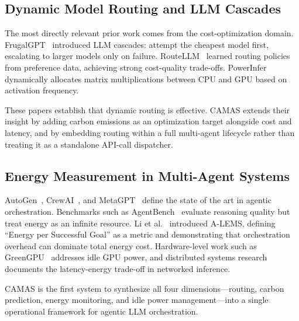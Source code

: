 \documentclass[journal]{IEEEtran}
\begin{document}
\subsection{Dynamic Model Routing and LLM Cascades}

The most directly relevant prior work comes from the cost-optimization domain.
FrugalGPT~\cite{chen2023frugalgpt} introduced LLM cascades: attempt the
cheapest model first, escalating to larger models only on failure.
RouteLLM~\cite{shao2024routellm} learned routing policies from preference data,
achieving strong cost-quality trade-offs. PowerInfer~\cite{song2024powerinfer}
dynamically allocates matrix multiplications between CPU and GPU based on
activation frequency.

These papers establish that dynamic routing is effective. CAMAS extends their
insight by adding carbon emissions as an optimization target alongside cost and
latency, and by embedding routing within a full multi-agent lifecycle rather
than treating it as a standalone API-call dispatcher.

\subsection{Energy Measurement in Multi-Agent Systems}

AutoGen~\cite{wu2023autogen}, CrewAI~\cite{moura2023crewai}, and
MetaGPT~\cite{hong2024metagpt} define the state of the art in agentic
orchestration. Benchmarks such as AgentBench~\cite{liu2024agentbench} evaluate
reasoning quality but treat energy as an infinite resource. Li et
al.~\cite{li2024alems} introduced A-LEMS, defining ``Energy per Successful
Goal'' as a metric and demonstrating that orchestration overhead can dominate
total energy cost. Hardware-level work such as GreenGPU~\cite{xu2021greengpu}
addresses idle GPU power, and distributed systems
research~\cite{tran2021energy} documents the latency-energy trade-off in
networked inference.

CAMAS is the first system to synthesize all four dimensions—routing, carbon
prediction, energy monitoring, and idle power management—into a single
operational framework for agentic LLM orchestration.
\end{document}
